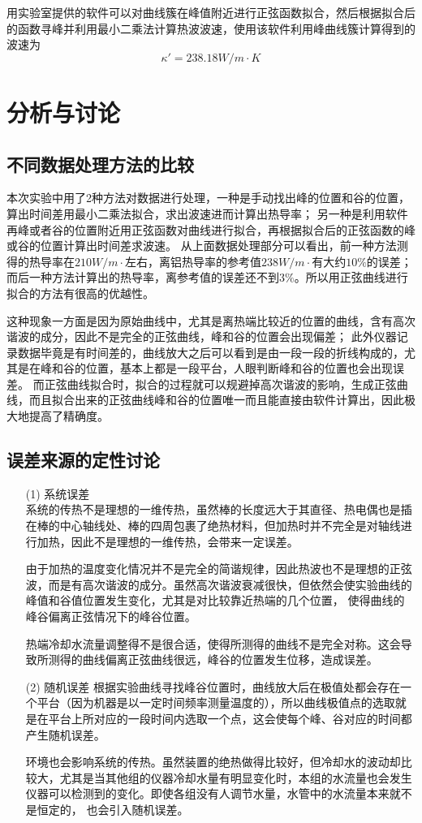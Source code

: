 \documentclass{article}
\begin{document}
    用实验室提供的软件可以对曲线簇在峰值附近进行正弦函数拟合，然后根据拟合后的函数寻峰并利用最小二乘法计算热波波速，使用该软件利用峰曲线簇计算得到的波速为
    $$\kappa'=238.18W/m\cdot K$$

    \section{分析与讨论}
    \subsection{不同数据处理方法的比较}
    本次实验中用了2种方法对数据进行处理，一种是手动找出峰的位置和谷的位置，算出时间差用最小二乘法拟合，求出波速进而计算出热导率；
    另一种是利用软件再峰或者谷的位置附近用正弦函数对曲线进行拟合，再根据拟合后的正弦函数的峰或谷的位置计算出时间差求波速。
    从上面数据处理部分可以看出，前一种方法测得的热导率在$210W/m\cdot$左右，离铝热导率的参考值$238W/m\cdot$有大约$10\%$的误差；
    而后一种方法计算出的热导率，离参考值的误差还不到$3\%$。所以用正弦曲线进行拟合的方法有很高的优越性。

    这种现象一方面是因为原始曲线中，尤其是离热端比较近的位置的曲线，含有高次谐波的成分，因此不是完全的正弦曲线，峰和谷的位置会出现偏差；
    此外仪器记录数据毕竟是有时间差的，曲线放大之后可以看到是由一段一段的折线构成的，尤其是在峰和谷的位置，基本上都是一段平台，人眼判断峰和谷的位置也会出现误差。
    而正弦曲线拟合时，拟合的过程就可以规避掉高次谐波的影响，生成正弦曲线，而且拟合出来的正弦曲线峰和谷的位置唯一而且能直接由软件计算出，因此极大地提高了精确度。

    \subsection{误差来源的定性讨论}
    \begin{enumerate}
        \item [(1)] 系统误差 \\
        系统的传热不是理想的一维传热，虽然棒的长度远大于其直径、热电偶也是插在棒的中心轴线处、棒的四周包裹了绝热材料，但加热时并不完全是对轴线进行加热，因此不是理想的一维传热，会带来一定误差。

        由于加热的温度变化情况并不是完全的简谐规律，因此热波也不是理想的正弦波，而是有高次谐波的成分。虽然高次谐波衰减很快，但依然会使实验曲线的峰值和谷值位置发生变化，尤其是对比较靠近热端的几个位置，
        使得曲线的峰谷偏离正弦情况下的峰谷位置。

        热端冷却水流量调整得不是很合适，使得所测得的曲线不是完全对称。这会导致所测得的曲线偏离正弦曲线很远，峰谷的位置发生位移，造成误差。

        \item [(2)] 随机误差
        根据实验曲线寻找峰谷位置时，曲线放大后在极值处都会存在一个平台（因为机器是以一定时间频率测量温度的），所以曲线极值点的选取就是在平台上所对应的一段时间内选取一个点，这会使每个峰、谷对应的时间都产生随机误差。

        环境也会影响系统的传热。虽然装置的绝热做得比较好，但冷却水的波动却比较大，尤其是当其他组的仪器冷却水量有明显变化时，本组的水流量也会发生仪器可以检测到的变化。即使各组没有人调节水量，水管中的水流量本来就不是恒定的，
        也会引入随机误差。
    \end{enumerate}
\end{document}
